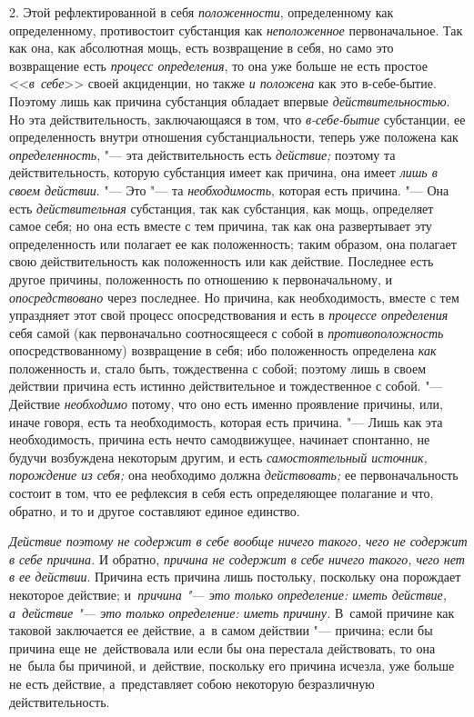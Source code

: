 2. Этой рефлектированной в себя {\em положенности},
определенному как определенному, противостоит субстанция как
{\em неположенное} первоначальное. Так как она, как
абсолютная мощь, есть возвращение в себя, но само это возвращение есть
{\em процесс определения}, то она уже больше не есть
простое <<{\em в~себе}>> своей акциденции, но также
{\em и положена} как это в-себе-бытие. Поэтому лишь как
причина субстанция обладает впервые
{\em действительностью}. Но эта действительность,
заключающаяся в том, что {\em в-себе-бытие} субстанции,
ее определенность внутри отношения субстанциальности, теперь уже положена
как {\em определенность}, "--- эта действительность есть
{\em действие;} поэтому та действительность, которую
субстанция имеет как причина, она имеет {\em лишь в
своем действии}. "--- Это "--- та {\em необходимость},
которая есть причина. "--- Она есть {\em действительная}
субстанция, так как субстанция, как мощь, определяет самое себя; но она
есть вместе с тем причина, так как она развертывает эту определенность или
полагает ее как положенность; таким образом, она полагает свою
действительность как положенность или как действие. Последнее есть другое
причины, положенность по отношению к первоначальному, и
{\em опосредствовано} через последнее. Но причина, как
необходимость, вместе с тем упраздняет этот свой процесс опосредствования и
есть в {\em процессе определения} себя самой (как
первоначально соотносящееся с собой в
{\em противоположность} опосредствованному) возвращение
в себя; ибо положенность определена {\em как}
положенность и, стало быть, тождественна с собой; поэтому лишь в своем
действии причина есть истинно действительное и тождественное с собой. "---
Действие {\em необходимо} потому, что оно есть именно
проявление причины, или, иначе говоря, есть та необходимость, которая есть
причина. "--- Лишь как эта необходимость, причина есть нечто самодвижущее,
начинает спонтанно, не будучи возбуждена некоторым другим, и есть
{\em самостоятельный источник, порождение из себя;} она
необходимо должна {\em действовать;} ее
первоначальность состоит в том, что ее рефлексия в себя есть определяющее
полагание и что, обратно, и то и другое составляют единое единство.

{\em Действие поэтому не содержит в себе вообще ничего такого, чего не содержит
в себе причина.} И обратно, {\em причина не содержит в себе ничего такого, чего
нет в ее действии}. Причина есть причина лишь постольку, поскольку она
порождает некоторое действие; и~{\em причина "--- это только определение:
иметь действие, а~действие "--- это только определение: иметь причину.}
В~самой причине как таковой заключается ее действие, а~в самом действии "---
причина; если бы причина еще не~действовала или если бы она перестала
действовать, то она не~была бы причиной, и~действие, поскольку его причина
исчезла, уже больше не есть действие, а~представляет собою некоторую
безразличную действительность.

